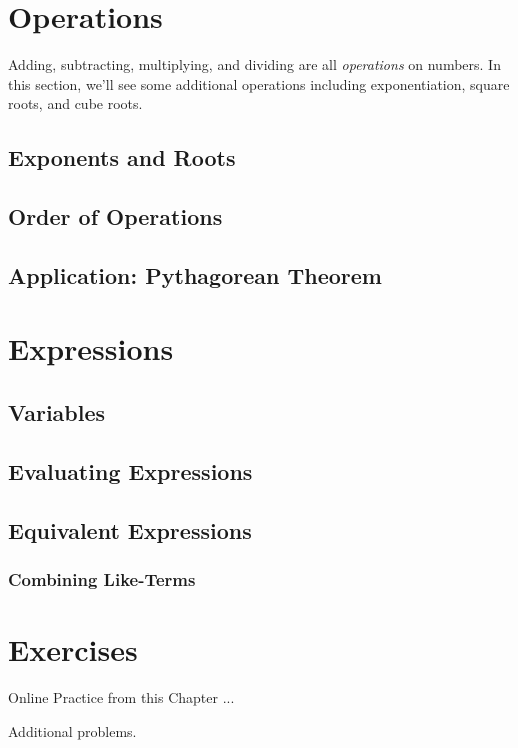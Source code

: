 \newpage 
\section{Operations}

Adding, subtracting, multiplying, and dividing are all \emph{operations} on numbers.  In this section, we'll see some additional operations including exponentiation, square roots, and cube roots.  

\subsection{Exponents and Roots} 
\subsection{Order of Operations}
\subsection{Application: Pythagorean Theorem} 



\newpage 
\section{Expressions}

\subsection{Variables}
\subsection{Evaluating Expressions}
\subsection{Equivalent Expressions}
\subsubsection{Combining Like-Terms}

\newpage 
\section{Exercises} 

Online Practice from this Chapter ... 

Additional problems. 















